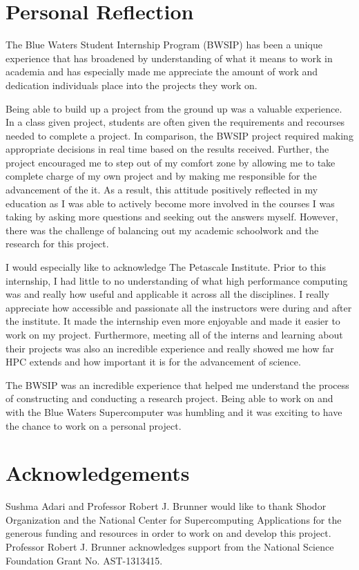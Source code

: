 \section{Personal Reflection}

The Blue Waters Student Internship Program (BWSIP) has been a unique experience that has broadened by understanding of what it means to work in academia and has especially made me appreciate the amount of work and dedication individuals place into the projects they work on. 

Being able to build up a project from the ground up was a valuable experience. In a class given project, students are often given the requirements and recourses needed to complete a project. In comparison, the BWSIP project required making appropriate decisions in real time based on the results received. Further, the project encouraged me to step out of my comfort zone by allowing me to take complete charge of my own project and by making me responsible for the advancement of the it. As a result, this attitude positively reflected in my education as I was able to actively become more involved in the courses I was taking by asking more questions and seeking out the answers myself. However, there was the challenge of balancing out my academic schoolwork and the research for this project. 

I would especially like to acknowledge The Petascale Institute. Prior to this internship, I had little to no understanding of what high performance computing was and really how useful and applicable it across all the disciplines. I really appreciate how accessible and passionate all the instructors were during and after the institute. It made the internship even more enjoyable and made it easier to work on my project. Furthermore, meeting all of the interns and learning about their projects was also an incredible experience and really showed me how far HPC extends and how important it is for the advancement of science.

The BWSIP was an incredible experience that helped me understand the process of constructing and conducting a research project. Being able to work on and with the Blue Waters Supercomputer was humbling and it was exciting to have the chance to work on a personal project.  
\section{Acknowledgements}

Sushma Adari and Professor Robert J. Brunner would like to thank Shodor Organization and the National Center for Supercomputing Applications for the generous funding and resources in order to work on and develop this project. Professor Robert J. Brunner acknowledges  support  from  the  National  Science  Foundation  Grant  No.
AST-1313415.
